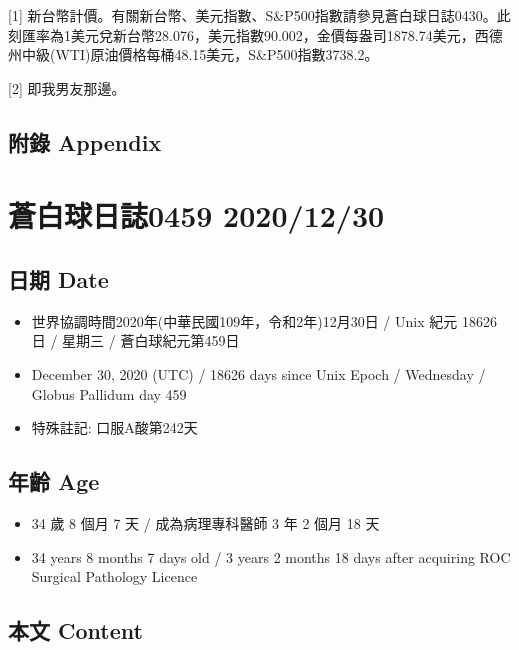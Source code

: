 \documentclass[a5paper, 10pt
]{book}
\providecommand{\tightlist}{%
  \setlength{\itemsep}{0pt}\setlength{\parskip}{0pt}}
\begin{document}
{[}1{]}
新台幣計價。有關新台幣、美元指數、S\&P500指數請參見蒼白球日誌0430。此刻匯率為1美元兌新台幣28.076，美元指數90.002，金價每盎司1878.74美元，西德州中級(WTI)原油價格每桶48.15美元，S\&P500指數3738.2。

{[}2{]} 即我男友那邊。

\hypertarget{ux9644ux9304-appendix-28}{%
\subsection{附錄 Appendix}\label{ux9644ux9304-appendix-28}}

\hypertarget{ux84bcux767dux7403ux65e5ux8a8c0459-20201230}{%
\section{蒼白球日誌0459
2020/12/30}\label{ux84bcux767dux7403ux65e5ux8a8c0459-20201230}}

\hypertarget{ux65e5ux671f-date-29}{%
\subsection{日期 Date}\label{ux65e5ux671f-date-29}}

\begin{itemize}
\tightlist
\item
  世界協調時間2020年(中華民國109年，令和2年)12月30日 / Unix 紀元 18626
  日 / 星期三 / 蒼白球紀元第459日
\item
  December 30, 2020 (UTC) / 18626 days since Unix Epoch / Wednesday /
  Globus Pallidum day 459
\item
  特殊註記: 口服A酸第242天
\end{itemize}

\hypertarget{ux5e74ux9f61-age-29}{%
\subsection{年齡 Age}\label{ux5e74ux9f61-age-29}}

\begin{itemize}
\tightlist
\item
  34 歲 8 個月 7 天 / 成為病理專科醫師 3 年 2 個月 18 天
\item
  34 years 8 months 7 days old / 3 years 2 months 18 days after
  acquiring ROC Surgical Pathology Licence
\end{itemize}

\hypertarget{ux672cux6587-content-29}{%
\subsection{本文 Content}\label{ux672cux6587-content-29}}
\end{document}
